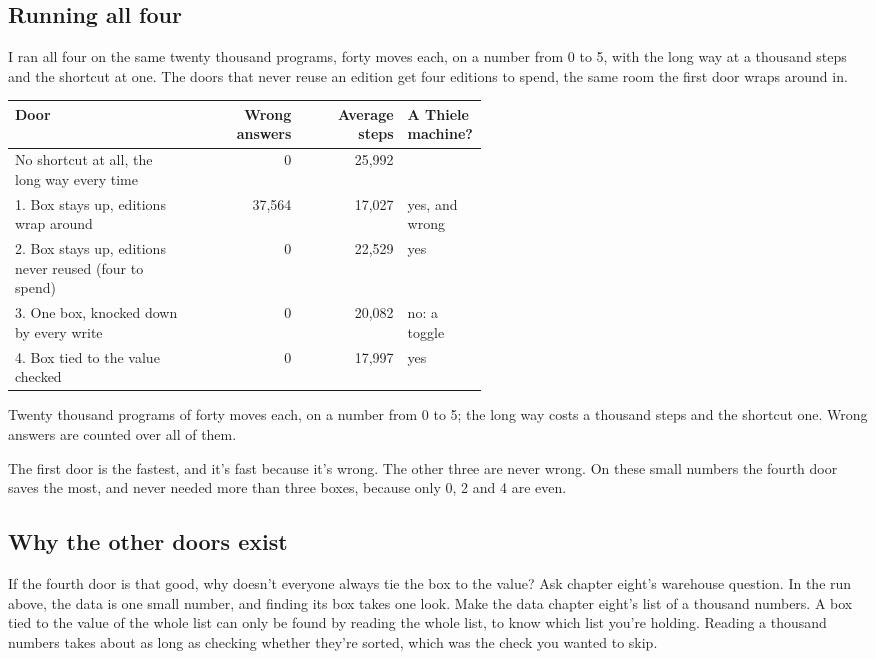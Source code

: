 \documentclass[11pt,twoside]{article}
\theoremstyle{thielethm}
\theoremstyle{thieledef}
\theoremstyle{thieledef}
\theoremstyle{thieledef}
\theoremstyle{thielethm}
\theoremstyle{thieleobs}
\theoremstyle{thielethm}
\begin{document}
\subsection{Running all four}

I ran all four on the same twenty thousand programs, forty moves each, on a number from 0 to 5, with the long way at a thousand steps and the shortcut at one. The doors that never reuse an edition get four editions to spend, the same room the first door wraps around in.

\begin{center}\small
\begin{tabular}{@{}p{0.38\linewidth}rr>{\raggedright\arraybackslash}p{0.17\linewidth}@{}}
\toprule
Door & Wrong answers & Average steps & A Thiele machine? \\
\midrule
No shortcut at all, the long way every time & 0 & 25{,}992 & \\
1. Box stays up, editions wrap around & 37{,}564 & 17{,}027 & yes, and wrong \\
2. Box stays up, editions never reused (four to spend) & 0 & 22{,}529 & yes \\
3. One box, knocked down by every write & 0 & 20{,}082 & no: a toggle \\
4. Box tied to the value checked & 0 & 17{,}997 & yes \\
\bottomrule
\end{tabular}

\footnotesize Twenty thousand programs of forty moves each, on a number from 0 to 5; the long
way costs a thousand steps and the shortcut one. Wrong answers are counted over all of them.
\end{center}

The first door is the fastest, and it's fast because it's wrong. The other three are never wrong. On these small numbers the fourth door saves the most, and never needed more than three boxes, because only 0, 2 and 4 are even.

\subsection{Why the other doors exist}

If the fourth door is that good, why doesn't everyone always tie the box to the value? Ask chapter eight's warehouse question. In the run above, the data is one small number, and finding its box takes one look. Make the data chapter eight's list of a thousand numbers. A box tied to the value of the whole list can only be found by reading the whole list, to know which list you're holding. Reading a thousand numbers takes about as long as checking whether they're sorted, which was the check you wanted to skip.
\end{document}
